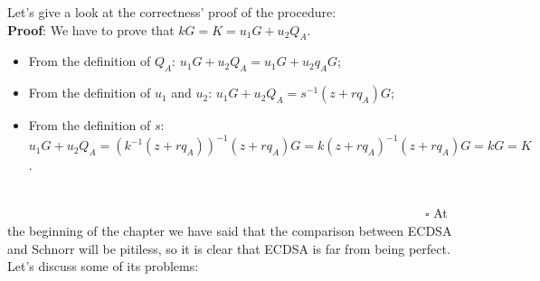 \bigskip
\noindent
Let's give a look at the correctness' proof of the procedure:
\\
{\bf Proof}: We have to prove that $kG = K = u_1G + u_2Q_A$.
\begin{itemize}
	\item From the definition of $Q_A$: $u_1G + u_2Q_A = u_1G + u_2q_AG$;
	\item From the definition of $u_1$ and $u_2$: $u_1G + u_2Q_A = s^{-1}(z + rq_A)G$;
	\item From the definition of $s$: $u_1G + u_2Q_A = (k^{-1}(z + rq_A))^{-1}(z + rq_A)G = k(z + rq_A)^{-1}(z + rq_A)G = kG = K$.
\end{itemize}
\ \ \ \ \ \ \ \ \ \ \ \ \ \ \ \ \ \ \ \ \ \ \ \ \ \ \ \ \ \ \ \ \ \ \ \ \ \ \ \ \ \ \ \ \ \ \ \ \ \ \ \ \ \ \ \ \ \ \ \ \ \ \ \ \ \ \ \ \ \ \ \ \ \ \ \ \ \ \ \ \ \ \ \ \ \ \ \ \ \ \ \ \ \ \ \ \ \ \ \ \ \ \ \ \ \ \ \ \ \ \ \ \ \ \ \ \ \ \ \ \ \ \ \ \ \ \ \ \ \ \ \ \ \ \ \ \ \ $\square$
At the beginning of the chapter we have said that the comparison between ECDSA and Schnorr will be pitiless, so it is clear that ECDSA is far from being perfect. Let's discuss some of its problems:
